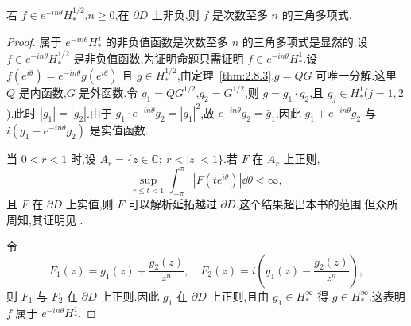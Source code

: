 \begin{proposition}\label{prop:2.10.6}
若 $f \in e^{-in\theta}H_{*}^{1/2}$,$n \geq 0$,在 $\partial D$ 上非负,则 $f$ 是次数至多 $n$ 的三角多项式.
\end{proposition}

\begin{proof}
属于 $e^{-in\theta}H_{*}^{1}$ 的非负值函数是次数至多 $n$ 的三角多项式是显然的.设 $f \in e^{-in\theta}H_{*}^{1/2}$ 是非负值函数,为证明命题只需证明 $f \in e^{-in\theta}H_{*}^{1}$.设 $f(e^{i\theta}) = e^{-in\theta}g(e^{i\theta})$ 且 $g \in H_{*}^{1/2}$,由定理~\ref{thm:2.8.3},$g = QG$ 可唯一分解.这里 $Q$ 是内函数,$G$ 是外函数.令 $g_{1} = QG^{1/2}$,$g_{2} = G^{1/2}$,则 $g = g_{1}\cdot g_{2}$,且 $g_{j} \in H_{*}^{1}$($j = 1, 2$).此时 $|g_{1}| = |g_{2}|$.由于 $g_{1}\cdot e^{-in\theta}g_{2} = |g_{1}|^{2}$,故 $e^{-in\theta}g_{2} = \bar{g}_{1}$.因此 $g_{1} + e^{-in\theta}g_{2}$ 与 $i(g_{1} - e^{-in\theta}g_{2})$ 是实值函数.

当 $0 < r < 1$ 时,设 $A_{r} = \{z \in \mathbb{C};\ r < |z| < 1\}$.若 $F$ 在 $A_{r}$ 上正则,
\begin{equation*}
\sup_{r \leq t < 1}\int_{-\pi}^{\pi}|F(te^{i\theta})|\dd\theta < \infty,
\end{equation*}
且 $F$ 在 $\partial D$ 上实值,则 $F$ 可以解析延拓越过 $\partial D$.这个结果超出本书的范围,但众所周知,其证明见 \cite{ch2:3}.

令
\begin{equation*}
F_{1}(z) = g_{1}(z) + \frac{g_{2}(z)}{z^{n}}, \quad F_{2}(z) = i\left(g_{1}(z) - \frac{g_{2}(z)}{z^{n}}\right),
\end{equation*}
则 $F_{1}$ 与 $F_{2}$ 在 $\partial D$ 上正则.因此 $g_{1}$ 在 $\partial D$ 上正则,且由 $g_{1} \in H_{*}^{\infty}$ 得 $g \in H_{*}^{\infty}$.这表明 $f$ 属于 $e^{-in\theta}H_{*}^{1}$.
\end{proof}
